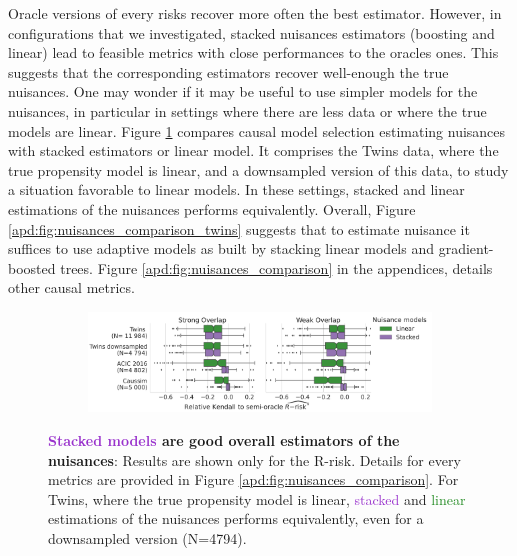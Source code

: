 \documentclass[10pt]{article}
\begin{document}
\begin{multicols}{2}
    Oracle versions of every risks recover more often the best estimator.
    However, in configurations that we investigated,
    stacked nuisances estimators (boosting and linear) lead to feasible
    metrics with close performances to the oracles ones. This suggests that the
    corresponding estimators recover well-enough the true nuisances.
    One may wonder if it may be useful to use simpler models for the
    nuisances, in particular in settings where there are less data or where
    the true models are linear.
    Figure \ref{fig:all_datasets_nuisances_comparison} compares causal model
    selection estimating nuisances with stacked estimators or linear model.
    It comprises the Twins data, where the true propensity model is linear,
    and a downsampled version of this data, to study a situation favorable to
    linear models. In these settings,
    stacked and linear estimations of the nuisances performs equivalently.
    Overall, Figure \ref{apd:fig:nuisances_comparison_twins} suggests that
    to estimate nuisance it suffices to use adaptive models as built by
    stacking linear models and gradient-boosted trees.
    Figure \ref{apd:fig:nuisances_comparison} in the appendices, details
    other causal metrics.

    \begin{figure}[!h]
        \begin{subfigure}[b]{0.48\textwidth}
            \centering
            \includegraphics[width=2\textwidth]{images/_4_nuisance_models_r_risk_only_3datasets.pdf}
        \end{subfigure}
        \hfill
        \caption{\textbf{\textcolor{DarkOrchid}{Stacked
                    models} are good overall estimators of the nuisances}:
            Results are shown only for the
            R-risk. Details for every metrics are provided in Figure
            \ref{apd:fig:nuisances_comparison}. For Twins, where the true propensity
            model is linear, \textcolor{DarkOrchid}{stacked} and
            \textcolor{ForestGreen}{linear}
            estimations of the nuisances performs equivalently, even for a downsampled version
            (N=4794). }\label{fig:all_datasets_nuisances_comparison}
    \end{figure}


\end{multicols}
\end{document}
